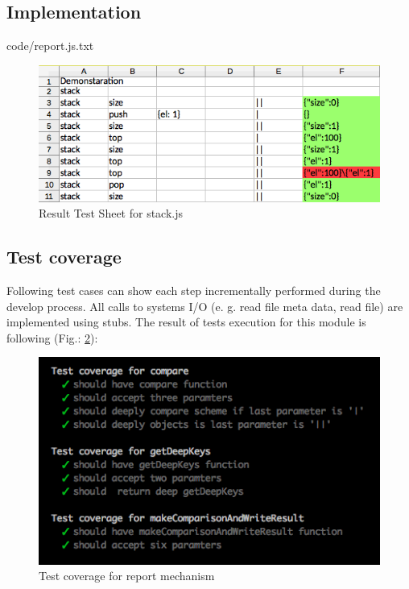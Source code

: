 \subsection{Implementation}

{code/report.js.txt}

\begin{figure}[H]
	\centering
	\includegraphics[width=\linewidth]{grafiken/testSheetResult.png}
	\caption{Result Test Sheet for stack.js}
	\label{fig:resultTestSheet}
\end{figure}


\subsection{Test coverage}
Following test cases can show each step incrementally performed during the develop process. All calls to systems I/O (e. g. read file meta data, read file) are implemented using stubs.
The result of tests execution  for this module is following (Fig.: \ref{fig:testReport}): 
\begin{figure}[H]
	\centering
	\includegraphics[width=\linewidth]{grafiken/testReport.png}
	\caption{Test coverage for report mechanism}
	\label{fig:testReport}
\end{figure}

